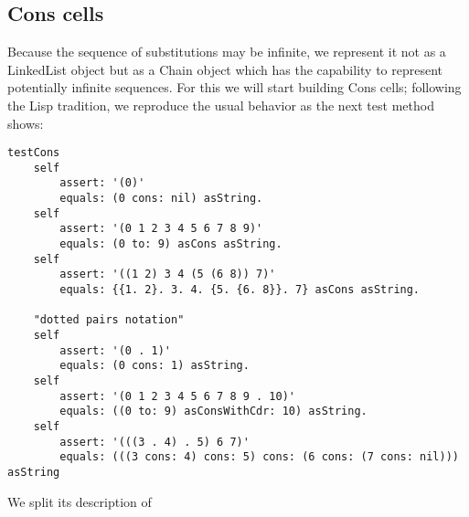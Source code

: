 \documentclass[a4paper,11pt]{article}
\newcommand{\ct}[1]{{\textsf{#1}}\xspace}
\begin{document}
\subsection{Cons cells}

Because the sequence of substitutions may be infinite, we represent it not as a
\ct{LinkedList} object but as a \ct{Chain} object which has the capability to
represent potentially infinite sequences.  For this we will start building
\ct{Cons} cells; following the Lisp tradition, we reproduce the usual behavior
as the next test method shows:
\begin{verbatim}
testCons
    self
        assert: '(0)'
        equals: (0 cons: nil) asString.
    self
        assert: '(0 1 2 3 4 5 6 7 8 9)'
        equals: (0 to: 9) asCons asString.
    self
        assert: '((1 2) 3 4 (5 (6 8)) 7)'
        equals: {{1. 2}. 3. 4. {5. {6. 8}}. 7} asCons asString.

    "dotted pairs notation"
    self
        assert: '(0 . 1)'
        equals: (0 cons: 1) asString.
    self
        assert: '(0 1 2 3 4 5 6 7 8 9 . 10)'
        equals: ((0 to: 9) asConsWithCdr: 10) asString.
    self
        assert: '(((3 . 4) . 5) 6 7)'
        equals: (((3 cons: 4) cons: 5) cons: (6 cons: (7 cons: nil))) asString
\end{verbatim}
We split its description of
\end{document}
